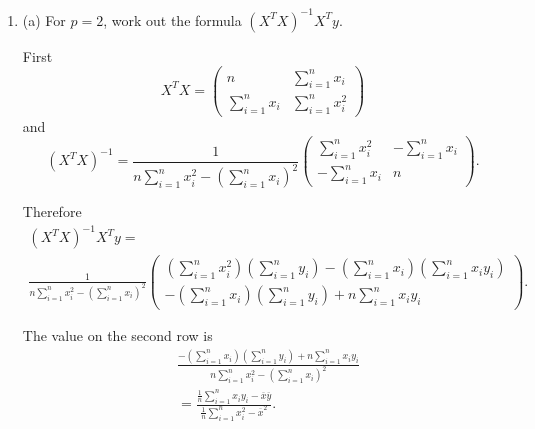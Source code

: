 \documentclass{tufte-book}
\begin{document}
\begin{enumerate}

\item{(a)} For $p=2$, work out the formula $(X^TX)^{-1}X^Ty$.

First
\[ X^TX = \begin{pmatrix}
n & \sum_{i=1}^n x_i\\
\sum_{i=1}^n x_i & \sum_{i=1}^n x_i^2
\end{pmatrix}
\]
and
\[ (X^TX)^{-1} = \frac{1}{n\sum_{i=1}^n x_i^2 - (\sum_{i=1}^nx_i)^2}
\begin{pmatrix}
\sum_{i=1}^n x_i^2 & -\sum_{i=1}^n x_i\\
-\sum_{i=1}^n x_i & n
\end{pmatrix}.
\]

Therefore
\begin{multline*}
(X^TX)^{-1}X^Ty=\\
\frac{1}{n\sum_{i=1}^n x_i^2 - (\sum_{i=1}^nx_i)^2}
\begin{pmatrix}
(\sum_{i=1}^nx_i^2)(\sum_{i=1}^ny_i) - (\sum_{i=1}^nx_i)(\sum_{i=1}^nx_iy_i)\\
-(\sum_{i=1}^nx_i)(\sum_{i=1}^ny_i) + n\sum_{i=1}^nx_iy_i
\end{pmatrix}.
\end{multline*}

The value on the second row is
\begin{align*}
&\frac{-(\sum_{i=1}^nx_i)(\sum_{i=1}^ny_i) + n\sum_{i=1}^n x_iy_i}{n\sum_{i=1}^nx_i^2 -(\sum_{i=1}^nx_i)^2}\\
&= \frac{\frac{1}{n}\sum_{i=1}^n x_iy_i - \overline{x}\overline{y}}{\frac{1}{n}\sum_{i=1}^nx_i^2 - \overline{x}^2}.
\end{align*}


\end{enumerate}
\end{document}
